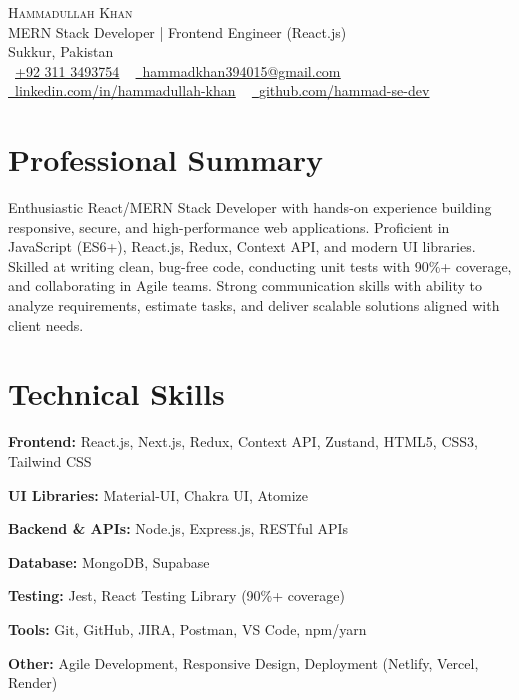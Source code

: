 \documentclass[letterpaper,11pt]{article}
\begin{document}
\begin{center}
    {\Huge \scshape Hammadullah Khan} \\ \vspace{1pt}
    \small MERN Stack Developer | Frontend Engineer (React.js) \\ \vspace{1pt}
    Sukkur, Pakistan \\ \vspace{1pt}
    \small \raisebox{-0.1\height}\faPhone\ \href{tel:+923113493754}{\underline{+92 311 3493754}} ~ 
    \href{mailto:hammadkhan394015@gmail.com}{\raisebox{-0.2\height}\faEnvelope\ \underline{hammadkhan394015@gmail.com}} ~ 
    \href{https://www.linkedin.com/in/hammadullah-khan}{\raisebox{-0.2\height}\faLinkedin\ \underline{linkedin.com/in/hammadullah-khan}} ~
    \href{https://github.com/hammad-se-dev}{\raisebox{-0.2\height}\faGithub\ \underline{github.com/hammad-se-dev}}
\end{center}

\section{Professional Summary}
Enthusiastic React/MERN Stack Developer with hands-on experience building responsive, secure, and high-performance web applications. Proficient in JavaScript (ES6+), React.js, Redux, Context API, and modern UI libraries. Skilled at writing clean, bug-free code, conducting unit tests with 90\%+ coverage, and collaborating in Agile teams. Strong communication skills with ability to analyze requirements, estimate tasks, and deliver scalable solutions aligned with client needs.

\section{Technical Skills}
\begin{itemize}[leftmargin=0.15in, label={}]
  \small{
    \item \textbf{Frontend:} React.js, Next.js, Redux, Context API, Zustand, HTML5, CSS3, Tailwind CSS
    \item \textbf{UI Libraries:} Material-UI, Chakra UI, Atomize
    \item \textbf{Backend \& APIs:} Node.js, Express.js, RESTful APIs
    \item \textbf{Database:} MongoDB, Supabase
    \item \textbf{Testing:} Jest, React Testing Library (90\%+ coverage)
    \item \textbf{Tools:} Git, GitHub, JIRA, Postman, VS Code, npm/yarn
    \item \textbf{Other:} Agile Development, Responsive Design, Deployment (Netlify, Vercel, Render)
  }
\end{itemize}
\end{document}
